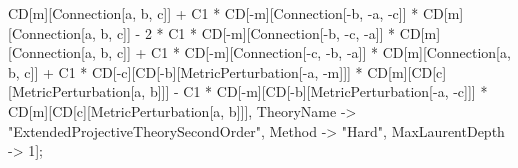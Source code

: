 CD[m][Connection[a, b, c]] + C1 * CD[-m][Connection[-b, -a, -c]] * CD[m][Connection[a, b, c]] - 2 * C1 * CD[-m][Connection[-b, -c, -a]] * CD[m][Connection[a, b, c]] + C1 * CD[-m][Connection[-c, -b, -a]] * CD[m][Connection[a, b, c]] + C1 * CD[-c][CD[-b][MetricPerturbation[-a, -m]]] * CD[m][CD[c][MetricPerturbation[a, b]]] - C1 * CD[-m][CD[-b][MetricPerturbation[-a, -c]]] * CD[m][CD[c][MetricPerturbation[a, b]]], TheoryName -> "ExtendedProjectiveTheorySecondOrder", Method -> "Hard", MaxLaurentDepth -> 1]; 